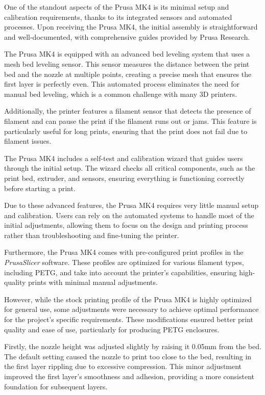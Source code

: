 One of the standout aspects of the Prusa MK4 is its minimal setup and calibration requirements, 
thanks to its integrated sensors and automated processes. Upon receiving the Prusa MK4, the 
initial assembly is straightforward and well-documented, with comprehensive guides provided by 
Prusa Research. 

The Prusa MK4 is equipped with an advanced bed leveling system that uses a mesh bed leveling 
sensor. This sensor measures the distance between the print bed and the nozzle at multiple points, 
creating a precise mesh that ensures the first layer is perfectly even. This automated process 
eliminates the need for manual bed leveling, which is a common challenge with many 3D printers.

Additionally, the printer features a filament sensor that detects the presence of filament and can 
pause the print if the filament runs out or jams. This feature is particularly useful for long 
prints, ensuring that the print does not fail due to filament issues.

The Prusa MK4 includes a self-test and calibration wizard that guides users through the initial 
setup. The wizard checks all critical components, such as the print bed, extruder, and sensors, 
ensuring everything is functioning correctly before starting a print.

Due to these advanced features, the Prusa MK4 requires very little manual setup and calibration. 
Users can rely on the automated systems to handle most of the initial adjustments, allowing them 
to focus on the design and printing process rather than troubleshooting and fine-tuning the 
printer.

Furthermore, the Prusa MK4 comes with pre-configured print profiles in the \textit{PrusaSlicer} 
software. These profiles are optimized for various filament types, including PETG, and take into 
account the printer's capabilities, ensuring high-quality prints with minimal manual adjustments.

However, while the stock printing profile of the Prusa MK4 is highly optimized for general use, 
some adjustments were necessary to achieve optimal performance for the project's specific 
requirements. These modifications ensured better print quality and ease of use, particularly for 
producing PETG enclosures.

Firstly, the nozzle height was adjusted slightly by raising it 0.05mm from the bed. The default 
setting caused the nozzle to print too close to the bed, resulting in the first layer rippling due 
to excessive compression. This minor adjustment improved the first layer's smoothness and 
adhesion, providing a more consistent foundation for subsequent layers.

